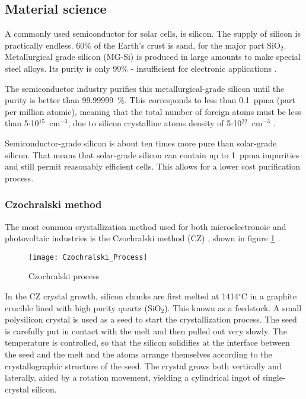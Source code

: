\subsection{Material science}

A commonly used semiconductor for solar cells, is silicon. The supply of silicon is practically endless. 60\% of the Earth's crust is sand, for the major part SiO$_2$. Metallurgical grade silicon (MG-Si) is produced in large amounts to make special steel alloys. Its purity is only 99\% - insufficient for electronic applications \cite{solar_cells}. 

The semiconductor industry purifies this metallurgical-grade silicon until the purity is better than 99.99999~\%. This corresponds to less than 0.1~ppma (part per million atomic), meaning that the total number of foreign atoms must be less than 5$\cdot$10$^{15}$~cm$^{-3}$, due to silicon crystalline atoms density of 5$\cdot$10$^{22}$~cm$^{-3}$ \cite{solar_cells}.

Semiconductor-grade silicon is about ten times more pure than solar-grade silicon. That means that solar-grade silicon can contain up to 1~ppma impurities and still permit reasonably efficient cells. This allows for a lower cost purification process.

\subsubsection{Czochralski method}

The most common crystallization method used for both microelectronoic and photovoltaic industries is the Czochralski method (CZ) ,  shown in figure \ref{fig:czochralski_process} \cite{solar_cells}.

\begin{figure}[H]
\texttt{[image: Czochralski\_Process]}%
\caption{Czochralski process}%
\label{fig:czochralski_process}%
\end{figure}

In the CZ crystal growth, silicon chunks are first melted at 1414$^\circ$C in a graphite crucible lined with high purity quartz (SiO$_2$). This known as a feedstock. A small polysilicon crystal is used as a seed to start the crystallization process. The seed is carefully put in contact with the melt and then pulled out very slowly. The temperature is controlled, so that the silicon solidifies at the interface between the seed and the melt and the atoms arrange themselves according to the crystallographic structure of the seed. The crystal grows both vertically and laterally, aided by a rotation movement, yielding a cylindrical ingot of single-crystal silicon. 

